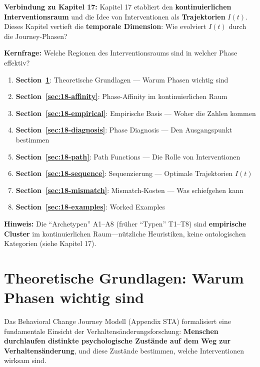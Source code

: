 \begin{tcolorbox}[colback=green!5!white, colframe=green!75!black,
    title=Chapter Overview]

\textbf{Verbindung zu Kapitel 17:} Kapitel 17 etabliert den \textbf{kontinuierlichen Interventionsraum} und die Idee von Interventionen als \textbf{Trajektorien} $I(t)$. Dieses Kapitel vertieft die \textbf{temporale Dimension}: Wie evolviert $I(t)$ durch die Journey-Phasen?

\textbf{Kernfrage:} Welche Regionen des Interventionsraums sind in welcher Phase effektiv?

\begin{enumerate}
\item \textbf{Section~\ref{sec:18-theory}}: Theoretische Grundlagen --- Warum Phasen wichtig sind
\item \textbf{Section~\ref{sec:18-affinity}}: Phase-Affinity im kontinuierlichen Raum
\item \textbf{Section~\ref{sec:18-empirical}}: Empirische Basis --- Woher die Zahlen kommen
\item \textbf{Section~\ref{sec:18-diagnosis}}: Phase Diagnosis --- Den Ausgangspunkt bestimmen
\item \textbf{Section~\ref{sec:18-path}}: Path Functions --- Die Rolle von Interventionen
\item \textbf{Section~\ref{sec:18-sequence}}: Sequenzierung --- Optimale Trajektorien $I(t)$
\item \textbf{Section~\ref{sec:18-mismatch}}: Mismatch-Kosten --- Was schiefgehen kann
\item \textbf{Section~\ref{sec:18-examples}}: Worked Examples
\end{enumerate}

\textbf{Hinweis:} Die ``Archetypen'' A1--A8 (fr\"{u}her ``Typen'' T1--T8) sind \textbf{empirische Cluster} im kontinuierlichen Raum---n\"{u}tzliche Heuristiken, keine ontologischen Kategorien (siehe Kapitel 17).
\end{tcolorbox}


\section{Theoretische Grundlagen: Warum Phasen wichtig sind}
\label{sec:18-theory}

Das Behavioral Change Journey Modell (Appendix STA) formalisiert eine fundamentale Einsicht der Verhaltensänderungsforschung: \textbf{Menschen durchlaufen distinkte psychologische Zustände auf dem Weg zur Verhaltensänderung}, und diese Zustände bestimmen, welche Interventionen wirksam sind.

